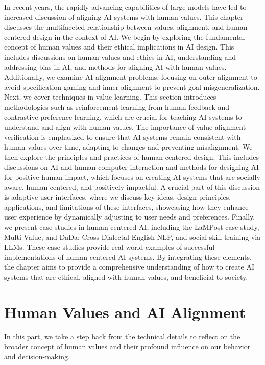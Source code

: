 \documentclass[
  letterpaper,
  numbers=noenddot,
  DIV=11,
  oneside]{scrreprt}
\theoremstyle{remark}
\begin{document}
In recent years, the rapidly advancing capabilities of large models have
led to increased discussion of aligning AI systems with human values.
This chapter discusses the multifaceted relationship between values,
alignment, and human-centered design in the context of AI. We begin by
exploring the fundamental concept of human values and their ethical
implications in AI design. This includes discussions on human values and
ethics in AI, understanding and addressing bias in AI, and methods for
aligning AI with human values. Additionally, we examine AI alignment
problems, focusing on outer alignment to avoid specification gaming and
inner alignment to prevent goal misgeneralization. Next, we cover
techniques in value learning. This section introduces methodologies such
as reinforcement learning from human feedback and contrastive preference
learning, which are crucial for teaching AI systems to understand and
align with human values. The importance of value alignment verification
is emphasized to ensure that AI systems remain consistent with human
values over time, adapting to changes and preventing misalignment. We
then explore the principles and practices of human-centered design. This
includes discussions on AI and human-computer interaction and methods
for designing AI for positive human impact, which focuses on creating AI
systems that are socially aware, human-centered, and positively
impactful. A crucial part of this discussion is adaptive user
interfaces, where we discuss key ideas, design principles, applications,
and limitations of these interfaces, showcasing how they enhance user
experience by dynamically adjusting to user needs and preferences.
Finally, we present case studies in human-centered AI, including the
LaMPost case study, Multi-Value, and DaDa: Cross-Dialectal English NLP,
and social skill training via LLMs. These case studies provide
real-world examples of successful implementations of human-centered AI
systems. By integrating these elements, the chapter aims to provide a
comprehensive understanding of how to create AI systems that are
ethical, aligned with human values, and beneficial to society.

\section{Human Values and AI
Alignment}\label{human-values-and-ai-alignment}

In this part, we take a step back from the technical details to reflect
on the broader concept of human values and their profound influence on
our behavior and decision-making.
\end{document}
